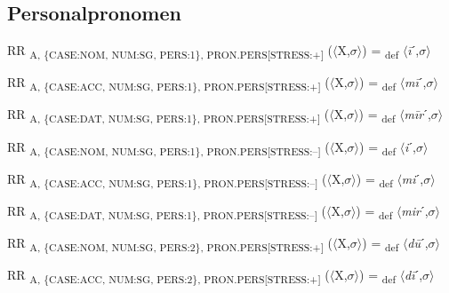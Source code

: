 {\subsection{Personalpronomen}

\begin{exe}
 RR \textsubscript{A, \{CASE:NOM, NUM:SG, PERS:1\}, PRON.PERS[STRESS:+]} ($\langle$X,$\sigma $$\rangle$) = \textsubscript{def} $\langle$\textit{\=i}ˊ,$\sigma $$\rangle$
\end{exe}

\begin{exe}
 RR \textsubscript{A, \{CASE:ACC, NUM:SG, PERS:1\}, PRON.PERS[STRESS:+]} ($\langle$X,$\sigma $$\rangle$) = \textsubscript{def} $\langle$\textit{m\=i}ˊ,$\sigma $$\rangle$
\end{exe}

\begin{exe}
 RR \textsubscript{A, \{CASE:DAT, NUM:SG, PERS:1\}, PRON.PERS[STRESS:+]} ($\langle$X,$\sigma $$\rangle$) = \textsubscript{def} $\langle$\textit{m\=ir}ˊ,$\sigma $$\rangle$
\end{exe}

\begin{exe}
 RR \textsubscript{A, \{CASE:NOM, NUM:SG, PERS:1\}, PRON.PERS[STRESS:–]} ($\langle$X,$\sigma $$\rangle$) = \textsubscript{def} $\langle$\textit{i}ˊ,$\sigma $$\rangle$
\end{exe}

\begin{exe}
 RR \textsubscript{A, \{CASE:ACC, NUM:SG, PERS:1\}, PRON.PERS[STRESS:–]} ($\langle$X,$\sigma $$\rangle$) = \textsubscript{def} $\langle$\textit{mi}ˊ,$\sigma $$\rangle$
\end{exe}

\begin{exe}
 RR \textsubscript{A, \{CASE:DAT, NUM:SG, PERS:1\}, PRON.PERS[STRESS:–]} ($\langle$X,$\sigma $$\rangle$) = \textsubscript{def} $\langle$\textit{mir}ˊ,$\sigma $$\rangle$
\end{exe}

\begin{exe}
 RR \textsubscript{A, \{CASE:NOM, NUM:SG, PERS:2\}, PRON.PERS[STRESS:+]} ($\langle$X,$\sigma $$\rangle$) = \textsubscript{def} $\langle$\textit{d\=u}ˊ,$\sigma $$\rangle$
\end{exe}

\begin{exe}
 RR \textsubscript{A, \{CASE:ACC, NUM:SG, PERS:2\}, PRON.PERS[STRESS:+]} ($\langle$X,$\sigma $$\rangle$) = \textsubscript{def} $\langle$\textit{d\=i}ˊ,$\sigma $$\rangle$
\end{exe}

}
